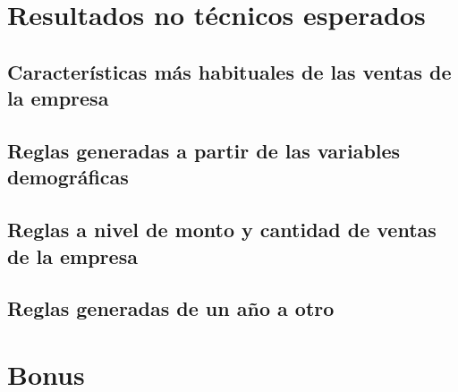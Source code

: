 \documentclass[]{article}
\begin{document}
\section{Resultados no técnicos esperados}


\subsection{Características más habituales de las ventas de la empresa}

\subsection{Reglas generadas a partir de las variables demográficas}

\subsection{Reglas a nivel de monto y cantidad de ventas de la empresa}

\subsection{Reglas generadas de un año a otro}

\section{Bonus}



\end{document}
